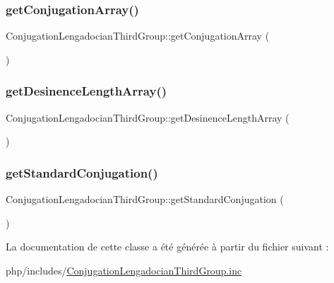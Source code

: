 \subsubsection{\texorpdfstring{get\+Conjugation\+Array()}{getConjugationArray()}}
{\footnotesize\ttfamily Conjugation\+Lengadocian\+Third\+Group\+::get\+Conjugation\+Array (\begin{DoxyParamCaption}{ }\end{DoxyParamCaption})\hspace{0.3cm}{\ttfamily [protected]}}

\hypertarget{class_conjugation_lengadocian_third_group_a728d85569c753bf2a42e963e51aeadfa}{}\label{class_conjugation_lengadocian_third_group_a728d85569c753bf2a42e963e51aeadfa} 
\subsubsection{\texorpdfstring{get\+Desinence\+Length\+Array()}{getDesinenceLengthArray()}}
{\footnotesize\ttfamily Conjugation\+Lengadocian\+Third\+Group\+::get\+Desinence\+Length\+Array (\begin{DoxyParamCaption}{ }\end{DoxyParamCaption})\hspace{0.3cm}{\ttfamily [protected]}}

\hypertarget{class_conjugation_lengadocian_third_group_a74123f02b8ac3ab7730bbc935acaefd5}{}\label{class_conjugation_lengadocian_third_group_a74123f02b8ac3ab7730bbc935acaefd5} 
\subsubsection{\texorpdfstring{get\+Standard\+Conjugation()}{getStandardConjugation()}}
{\footnotesize\ttfamily Conjugation\+Lengadocian\+Third\+Group\+::get\+Standard\+Conjugation (\begin{DoxyParamCaption}{ }\end{DoxyParamCaption})\hspace{0.3cm}{\ttfamily [protected]}}



La documentation de cette classe a été générée à partir du fichier suivant \+:\begin{DoxyCompactItemize}
\item 
php/includes/\hyperlink{_conjugation_lengadocian_third_group_8inc}{Conjugation\+Lengadocian\+Third\+Group.\+inc}\end{DoxyCompactItemize}
